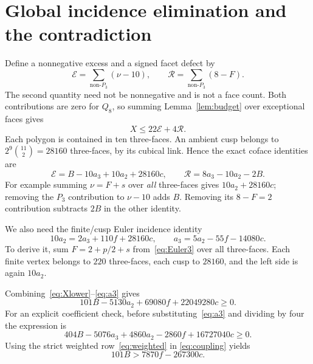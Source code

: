 \documentclass[11pt]{article}
\newcommand{\Pthree}{P_3}
\newcommand{\Qeight}{Q_8}
\begin{document}
\section{Global incidence elimination and the contradiction}
Define a nonnegative excess and a signed facet defect by
\[
 \mathcal E=\sum_{\text{non-}\Pthree}(\nu-10),\qquad
 \mathcal R=\sum_{\text{non-}\Pthree}(8-F).
\]
The second quantity need not be nonnegative and is not a face count.
Both contributions are zero for $\Qeight$, so summing
Lemma~\ref{lem:budget} over exceptional faces gives
\begin{equation}\label{eq:Xupper}
 X\le22\mathcal E+4\mathcal R.
\end{equation}
Each polygon is contained in ten three-faces. An ambient cusp
belongs to $2^9\binom{11}{2}=28160$ three-faces, by its cubical
link. Hence the exact coface identities are
\begin{equation}\label{eq:ER}
 \mathcal E=B-10a_3+10a_2+28160c,\qquad
 \mathcal R=8a_3-10a_2-2B.
\end{equation}
For example summing $\nu=F+s$ over \emph{all} three-faces gives
$10a_2+28160c$; removing the $\Pthree$ contribution to
$\nu-10$ adds $B$. Removing its $8-F=2$ contribution subtracts
$2B$ in the other identity.

We also need the finite/cusp Euler incidence identity
\begin{equation}\label{eq:a3}
 10a_2=2a_3+110f+28160c,\qquad
 a_3=5a_2-55f-14080c.
\end{equation}
To derive it, sum $F=2+p/2+s$ from~\eqref{eq:Euler3} over
all three-faces. Each finite vertex belongs to $220$ three-faces,
each cusp to $28160$, and the left side is again $10a_2$.

Combining~\eqref{eq:Xlower}--\eqref{eq:a3} gives
\begin{equation}\label{eq:coupling}
 101B-5130a_2+69080f+22049280c\ge0.
\end{equation}
For an explicit coefficient check, before substituting~\eqref{eq:a3}
and dividing by four the expression is
\[
 404B-5076a_3+4860a_2-2860f+16727040c\ge0.
\]
Using the strict weighted row~\eqref{eq:weighted} in
\eqref{eq:coupling} yields
\begin{equation}\label{eq:lowerone}
 101B>7870f-267300c.
\end{equation}
\end{document}
